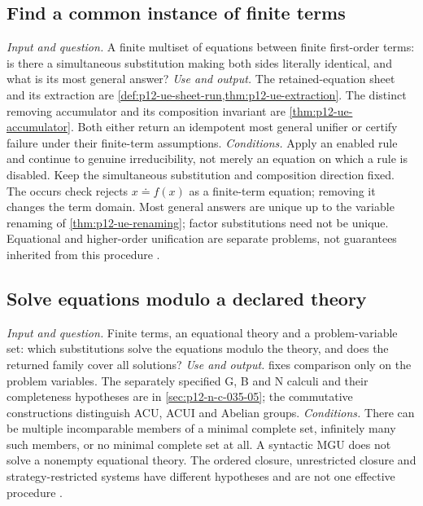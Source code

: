 \subsection{Find a common instance of finite terms}
\label{sec:p14-finder-syntactic-unification}
\textit{Input and question.} A finite multiset of equations between finite
first-order terms: is there a simultaneous substitution making both sides
literally identical, and what is its most general answer?
\textit{Use and output.} The retained-equation sheet and its extraction
are \cref{def:p12-ue-sheet-run,thm:p12-ue-extraction}. The distinct
removing accumulator and its composition invariant are
\cref{thm:p12-ue-accumulator}. Both either return an idempotent most
general unifier or certify failure under their finite-term assumptions.
\textit{Conditions.} Apply an enabled rule and continue to genuine
irreducibility, not merely an equation on which a rule is disabled. Keep
the simultaneous substitution and composition direction fixed.
The occurs check rejects \(x\doteq f(x)\) as a finite-term equation;
removing it changes the term domain. Most general answers are unique
up to the variable renaming of \cref{thm:p12-ue-renaming}; factor
substitutions need not be unique. Equational and higher-order unification
are separate problems, not guarantees inherited from this procedure
\cite{MartelliMontanari1982,BaaderSnyder2001}.

\subsection{Solve equations modulo a declared theory}
\label{sec:p14-finder-equational-unification}
\textit{Input and question.} Finite terms, an equational theory and a
problem-variable set: which substitutions solve the equations modulo the
theory, and does the returned family cover all solutions?
\textit{Use and output.}  fixes comparison
only on the problem variables. The separately specified G, B and N
calculi and their completeness hypotheses are in
\cref{sec:p12-n-c-035-05}; the commutative constructions distinguish
ACU, ACUI and Abelian groups.
\textit{Conditions.} There can be multiple incomparable members of a
minimal complete set, infinitely many such members, or no minimal complete
set at all. A syntactic MGU does not solve a nonempty equational theory.
The ordered closure, unrestricted closure and strategy-restricted systems
have different hypotheses and are not one effective procedure
\cite{BaaderSnyder2001,DershowitzPlaisted2001Rewriting}.

